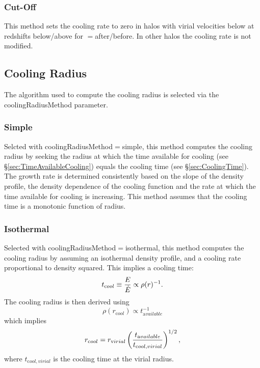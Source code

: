 \subsubsection{Cut-Off}

This method sets the cooling rate to zero in halos with virial velocities below {\normalfont \ttfamily [coolingCutOffVelocity]} at redshifts below/above {\normalfont \ttfamily [coolingCutOffRedshift]} for {\normalfont \ttfamily [coolingCutOffWhen]}$=${\normalfont \ttfamily after/before}. In other halos the cooling rate is not modified.

\subsection{Cooling Radius}\label{sec:CoolingRadius}

The algorithm used to compute the cooling radius is selected via the {\normalfont \ttfamily coolingRadiusMethod} parameter.

\subsubsection{Simple}

Selcted with {\normalfont \ttfamily coolingRadiusMethod}$=${\normalfont \ttfamily simple}, this method computes the cooling radius by seeking the radius at which the time available for cooling (see \S\ref{sec:TimeAvailableCooling}) equals the cooling time (see \S\ref{sec:CoolingTime}). The growth rate is determined consistently based on the slope of the density profile, the density dependence of the cooling function and the rate at which the time available for cooling is increasing. This method assumes that the cooling time is a monotonic function of radius.

\subsubsection{Isothermal}

Selected with {\normalfont \ttfamily coolingRadiusMethod}$=${\normalfont \ttfamily isothermal}, this method computes the cooling radius by assuming an isothermal density profile, and a cooling rate proportional to density squared. This implies a cooling time:
\begin{equation}
 t_{\mathrm cool} \equiv {E\over\dot{E}} \propto \rho(r)^{-1}.
\end{equation}
The cooling radius is then derived using
\begin{equation}
 \rho(r_{\mathrm cool}) \propto t_{\mathrm available}^{-1}
\end{equation}
which implies
\begin{equation}
 r_{\mathrm cool} = r_{\mathrm virial} \left( { t_{\mathrm available} \over t_{\mathrm cool,virial}} \right)^{1/2},
\end{equation}
where $t_{\mathrm cool,virial}$ is the cooling time at the virial radius.

